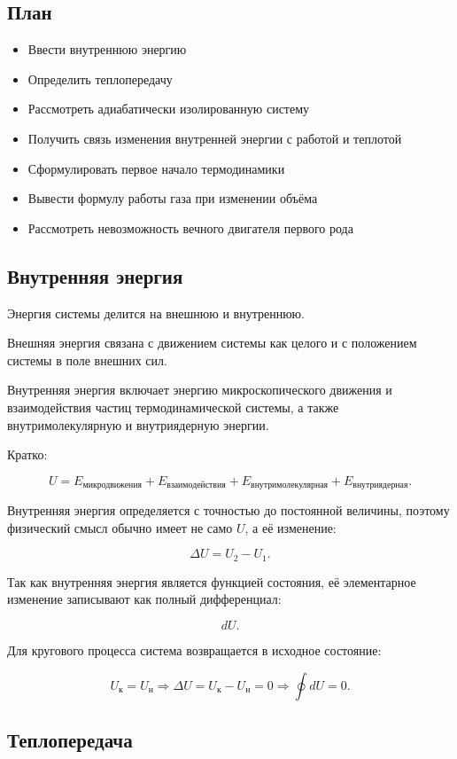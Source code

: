 \documentclass[a4paper,12pt]{article}
\begin{document}
\subsection*{План}
\begin{itemize}
\item Ввести внутреннюю энергию
\item Определить теплопередачу
\item Рассмотреть адиабатически изолированную систему
\item Получить связь изменения внутренней энергии с работой и теплотой
\item Сформулировать первое начало термодинамики
\item Вывести формулу работы газа при изменении объёма
\item Рассмотреть невозможность вечного двигателя первого рода
\end{itemize}

\subsection*{Внутренняя энергия}

Энергия системы делится на внешнюю и внутреннюю.

Внешняя энергия связана с движением системы как целого и с положением системы в поле внешних сил.

Внутренняя энергия включает энергию микроскопического движения и взаимодействия частиц термодинамической системы, а также внутримолекулярную и внутриядерную энергии.

Кратко:

\[
U=E_{\text{микродвижения}}+E_{\text{взаимодействия}}+E_{\text{внутримолекулярная}}+E_{\text{внутриядерная}}.
\]

Внутренняя энергия определяется с точностью до постоянной величины, поэтому физический смысл обычно имеет не само $U$, а её изменение:

\[
\Delta U=U_2-U_1.
\]

Так как внутренняя энергия является функцией состояния, её элементарное изменение записывают как полный дифференциал:

\[
dU.
\]

Для кругового процесса система возвращается в исходное состояние:

\[
U_{\text{к}}=U_{\text{н}}\Rightarrow \Delta U=U_{\text{к}}-U_{\text{н}}=0\Rightarrow \oint dU=0.
\]

\subsection*{Теплопередача}
\end{document}

